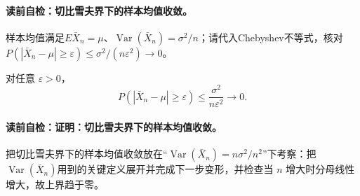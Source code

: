 \label{struct:V1-C04-CH14}
\paragraph{读前自检：切比雪夫界下的样本均值收敛。}样本均值满足$E\bar X_n=\mu$、$\operatorname{Var}(\bar X_n)=\sigma^2/n$；请代入Chebyshev不等式，核对$P(|\bar X_n-\mu|\ge\varepsilon)\le\sigma^2/(n\varepsilon^2)\to0$。\par

\begin{corollary}[切比雪夫界下的样本均值收敛]
对任意 $\varepsilon>0$，
\[
P(|\bar X_n-\mu|\ge\varepsilon)\le\frac{\sigma^2}{n\varepsilon^2}\longrightarrow0.
\]
\end{corollary}
\paragraph{读前自检：证明：切比雪夫界下的样本均值收敛。}把切比雪夫界下的样本均值收敛放在“$\operatorname{Var}(\bar X_n)=n\sigma^2/n^2$”下考察：把$\operatorname{Var}(\bar X_n)$用到的关键定义展开并完成下一步变形，并检查当 $n$ 增大时分母线性增大，故上界趋于零。\par

